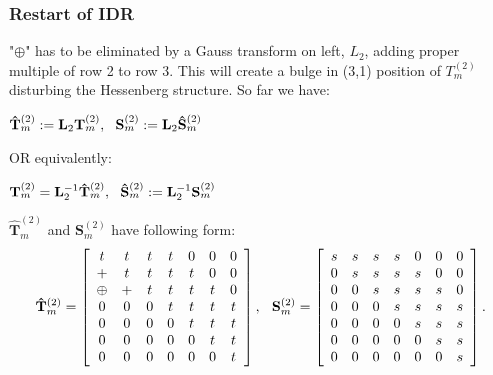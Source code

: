 \documentclass[mathserif]{beamer}
\begin{document}
\begin{frame}
\frametitle{Restart of IDR}

"$\oplus$" has to be eliminated by a Gauss transform on left, $L_2$, adding proper multiple of row 2 to row 3. This will create a bulge in (3,1) position of $T_m^{(2)}$ disturbing the Hessenberg structure. So far we have:
\vspace{.1in}

\hspace{1in} $\mathbf{\hat T}_m^{(2)}:=\mathbf{L}_2 \mathbf{T}_m^{(2)}, \hspace{.09in} \mathbf{S}_m^{(2)}:=\mathbf{L}_2 \mathbf{\hat S}_m^{(2)}$

OR equivalently:
\vspace{.1in}

\hspace{1in} $\mathbf{T}_m^{(2)}=\mathbf{L}_2^{-1} \mathbf{\hat T}_m^{(2)}, \hspace{.09in} \mathbf{\hat S}_m^{(2)}:=\mathbf{L}_2^{-1} \mathbf{S}_m^{(2)}$
\pause

$\mathbf{\hat T}_m^{(2)}$ and $\mathbf{S}_m^{(2)}$ have following form:
\[
\mathbf{\hat T}_m^{(2)}= \left[
\begin{array}{cccccccc}
t & t & t & t  & 0 & 0 & 0 \\
+ & t & t & t  & t & 0 & 0 \\
\oplus & +  & t  & t  & t & t & 0 \\
0 & 0  & 0  & t  & t & t & t \\
0 & 0  & 0  & 0  & t & t & t \\
0 & 0  & 0  & 0  & 0 & t & t\\
0 & 0  & 0  & 0  & 0 & 0 & t \\
\end{array}
\right], \hspace{.1in}
\mathbf{S}_m^{(2)}=\left[
\begin{array}{cccccccc}
s & s & s & s  & 0 & 0 & 0 \\
0 & s & s & s  & s & 0 & 0 \\
0 & 0 & s & s & s & s & 0 \\
0 & 0  & 0  & s & s & s & s \\
0 & 0  & 0  & 0  & s & s & s \\
0 & 0  & 0  & 0  & 0 & s & s\\
0 & 0  & 0  & 0  & 0 & 0 & s \\
\end{array}
\right].
\]
\end{frame}
\end{document}
